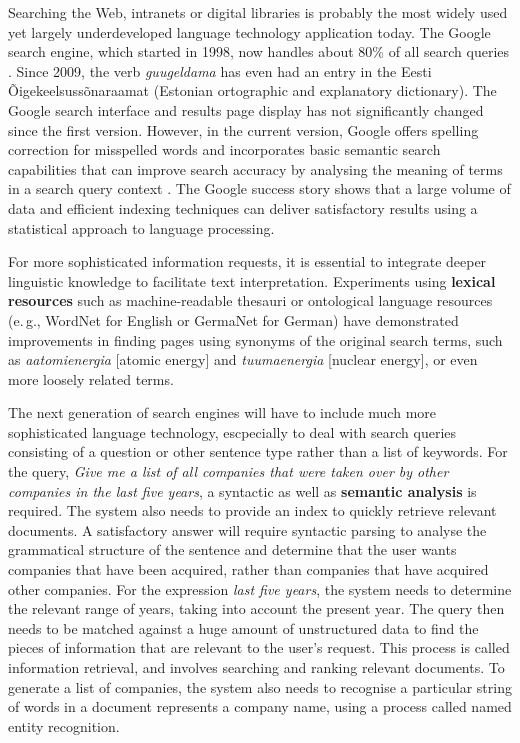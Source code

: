 \documentclass[]{../metanetpaper}
\begin{document}
\begin{multicols}{2}
Searching the Web, intranets or digital libraries is probably the most widely used yet largely underdeveloped language technology application today. The Google search engine, which started in 1998, now handles about 80\% of all search queries \cite{spi1}. Since 2009, the verb \textit{guugeldama} has even had an entry in the Eesti Õigekeelsussõnaraamat (Estonian ortographic and explanatory dictionary). The Google search interface and results page display has not significantly changed since the first version. However, in the current version, Google offers spelling correction for misspelled words and incorporates basic semantic search capabilities that can improve search accuracy by analysing the meaning of terms in a search query context \cite{pc1}. The Google success story shows that a large volume of data and efficient indexing techniques can deliver satisfactory results using a statistical approach to language processing. 

For more sophisticated information requests, it is essential to integrate deeper linguistic knowledge to facilitate text interpretation. Experiments using \textbf{lexical resources} such as machine-readable thesauri or ontological language resources (e.\,g., WordNet for English or GermaNet for German) have demonstrated improvements in finding pages using synonyms of the original search terms, such as \textit{aatomienergia} {[}atomic energy{]} and \textit{tuumaenergia} {[}nuclear energy{]}, or even more loosely related terms.


The next generation of search engines will have to include much more sophisticated language technology, escpecially to deal with search queries consisting of a question or other sentence type rather than a list of keywords. For the query, \textit{Give me a list of all companies that were taken over by other companies in the last five years}, a syntactic as well as \textbf{semantic analysis} is required. The system also needs to provide an index to quickly retrieve relevant documents. A satisfactory answer will require syntactic parsing to analyse the grammatical structure of the sentence and determine that the user wants companies that have been acquired, rather than companies that have acquired other companies. For the expression \textit{last five years}, the system needs to determine the relevant range of years, taking into account the present year. The query then needs to be matched against a huge amount of unstructured data to find the pieces of information that are relevant to the user’s request. This process is called information retrieval, and involves searching and ranking relevant documents. To generate a list of companies, the system also needs to recognise a particular string of words in a document represents a company name, using a process called named entity recognition.


\end{multicols}
\end{document}
